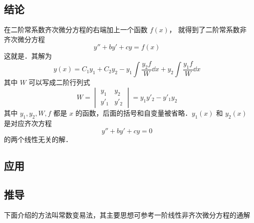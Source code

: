 

\subsection{结论}

在二阶常系数齐次微分方程的右端加上一个函数 $f(x)$， 就得到了二阶常系数非齐次微分方程
\begin{equation}\label{Ode2N_eq1}
y'' + by' + cy = f(x)
\end{equation}
这就是．其解为
\begin{equation}
y(x) = C_1 y_1 + C_2 y_2 - y_1\int \frac{y_2 f}{W} \dd{x} + y_2\int \frac{y_1 f}{W} \dd{x}
\end{equation}
其中 $W$ 可以写成二阶行列式
\begin{equation}
W = 
\begin{vmatrix}
y_1 & y_2\\
y'_1 & y'_2
\end{vmatrix} = y_1 y'_2 - y'_1 y_2
\end{equation}
其中 $y_1, y_2, W, f$ 都是 $x$ 的函数，后面的括号和自变量被省略．$y_1(x)$ 和 $y_2(x)$ 是对应齐次方程 
\begin{equation}\label{Ode2N_eq4}
y'' + by' + cy = 0
\end{equation}
的两个线性无关的解．

\subsection{应用} %

\subsection{推导}

下面介绍的方法叫常数变易法，其主要思想可参考一阶线性非齐次微分方程的通解%

